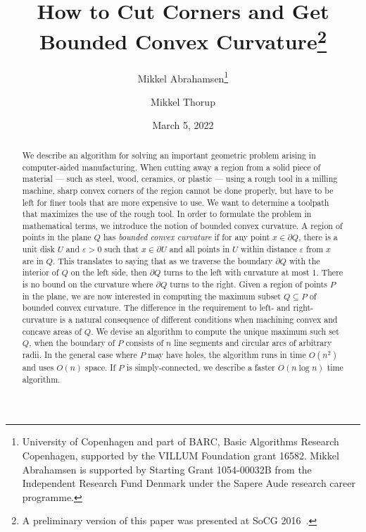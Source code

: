 \documentclass{article}
\newcommand{\PP}{P}
\newcommand{\QQ}{Q}
\newcommand{\ee}{\varepsilon}
\begin{document}
\title{How to Cut Corners and Get Bounded Convex Curvature\footnote{A
preliminary version of this paper was presented at SoCG 2016~\cite{abrahamsen_et_al:LIPIcs:2016:5896}.}}

\author{Mikkel Abrahamsen\footnote{University of Copenhagen and part of BARC, Basic Algorithms Research Copenhagen, supported by the VILLUM Foundation grant 16582. Mikkel Abrahamsen is supported by Starting Grant 1054-00032B from the Independent Research Fund Denmark under the Sapere Aude research career programme.}
\and Mikkel Thorup\footnotemark[2]}

\date{March 5, 2022}

\maketitle

\begin{abstract}
We describe an algorithm for solving an important geometric problem arising in computer-aided manufacturing.
When cutting away a region from a solid piece of material --- such as steel, wood, ceramics, or plastic --- using a rough tool in a milling machine, sharp convex corners of the region cannot be done properly, but have to be left for finer tools that are more expensive to use.
We want to determine a toolpath that maximizes the use of the rough tool.
In order to formulate the problem in mathematical terms, we introduce the notion of bounded convex curvature.
A region of points in the plane $\QQ$ has \emph{bounded convex curvature} if for any point $x\in\partial\QQ$, there is a unit disk $U$ and $\ee>0$ such that $x\in \partial U$ and all points in $U$ within distance $\ee$ from $x$ are in $\QQ$.
This translates to saying that as we traverse the boundary $\partial\QQ$ with the interior of $\QQ$ on the left side, then $\partial\QQ$ turns to the left with curvature at most $1$.
There is no bound on the curvature where $\partial\QQ$ turns to the right.
Given a region of points $\PP$ in the plane, we are now interested in computing the maximum subset $\QQ\subseteq \PP$ of bounded convex curvature.
The difference in the requirement to left- and right-curvature is a natural consequence of different conditions when machining convex and concave areas of $\QQ$.
We devise an algorithm to compute the unique maximum such set $\QQ$, when the boundary of $\PP$ consists of $n$ line segments and circular arcs of arbitrary radii.
In the general case where $\PP$ may have holes, the algorithm runs in time $O(n^2)$ and uses $O(n)$ space.
If $\PP$ is simply-connected, we describe a faster $O(n\log n)$ time algorithm.
\end{abstract}
\end{document}
